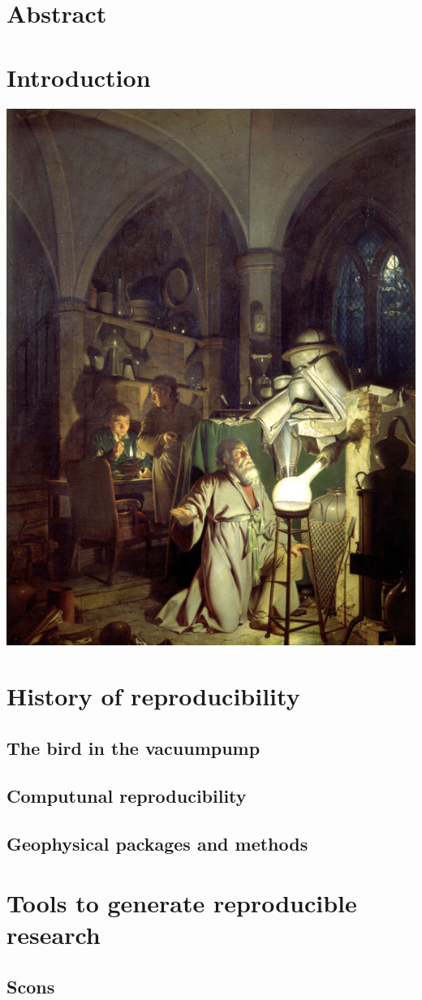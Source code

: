 \documentclass[11pt,a4paper]{article}
\begin{document}
\section*{Abstract}


\section{Introduction}

\includegraphics[width=0.55\linewidth]{img/Wright_alchemy.jpg}


\section{History of reproducibility}
\subsection{The bird in the vacuumpump}

\subsection{Computunal reproducibility}

\subsection{Geophysical packages and methods}


\section{Tools to generate reproducible research}
\subsection{Scons}

\end{document}
